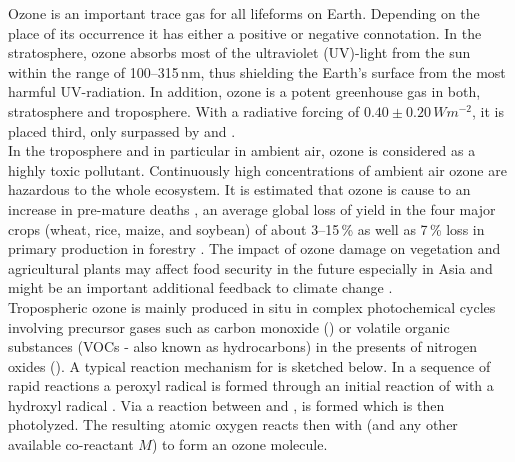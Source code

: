 \documentclass[gmd, manuscript]{copernicus}
\begin{document}
\introduction  %
Ozone is an important trace gas for all lifeforms on Earth. Depending on the place of its occurrence it has either a positive or negative connotation. In the stratosphere, ozone absorbs most of the ultraviolet (UV)-light from the sun within the range of 100--315\,\unit{nm}, thus shielding the Earth's surface from the most harmful UV-radiation. In addition, ozone is a potent greenhouse gas in both, stratosphere and troposphere. With a radiative forcing of $0.40 \pm 0.20\,\unit{Wm^{-2}}$, it is placed third, only surpassed by  and  \citep[Chapter 8]{IPCC2013}.\\
In the troposphere and in particular in ambient air, ozone is considered as a highly toxic pollutant. Continuously high concentrations of ambient air ozone are hazardous to the whole ecosystem. It is estimated that ozone is cause to an increase in pre-mature deaths \citep{WHO2008}, an average global loss of yield in the four major crops (wheat, rice, maize, and soybean) of about 3--15\,\unit{\%} \citep{PJ:Ainsworth2017} as well as 7\,\unit{\%} loss in primary production in forestry \citep{GCB:Wittig2009,EP:Matyssek2012}. The impact of ozone damage on vegetation and agricultural plants may affect food security in the future especially in Asia \citep{GCB:Tang2013,NCC:Tai2014,AE:Chuwah2015} and might be an important additional feedback to climate change \citep{Nat:Sitch2007}.\\
Tropospheric ozone is mainly produced in situ in complex photochemical cycles involving precursor gases such as carbon monoxide () or volatile organic substances (VOCs - also known as hydrocarbons) in the presents of nitrogen oxides (). A typical reaction mechanism for  is sketched below. In a sequence of rapid reactions a peroxyl radical  is formed through an initial reaction of  with a hydroxyl radical .
Via a reaction between  and ,  is formed which is then photolyzed. The resulting atomic oxygen reacts then with  (and any other available co-reactant $M$) to form an ozone molecule.
\end{document}
